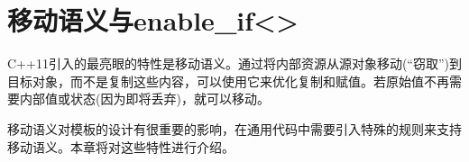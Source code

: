 \chapter{移动语义与enable\_if<>}
C++11引入的最亮眼的特性是移动语义。通过将内部资源从源对象移动(“窃取”)到目标对象，而不是复制这些内容，可以使用它来优化复制和赋值。若原始值不再需要内部值或状态(因为即将丢弃)，就可以移动。

移动语义对模板的设计有很重要的影响，在通用代码中需要引入特殊的规则来支持移动语义。本章将对这些特性进行介绍。





